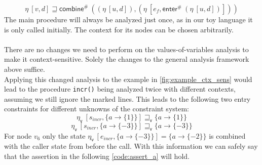     \[\eta\ [v, d] \sqsupseteq \textsf{combine}^{\#}\ ((\eta\ [u, d]), (\eta\ [e_f, \textsf{enter}^{\#}\ (\eta\ [u, d])])) \]
    The main procedure will always be analyzed just once, as in our toy language it is only called initially. The context for its nodes can be chosen arbitrarily.\\
    \\
    There are no changes we need to perform on the values-of-variables analysis to make it context-sensitive. Solely the changes to the general analysis framework above suffice.\\ Applying this changed analysis to the example in \autoref{fig:example_ctx_sens} would lead to the procedure \texttt{incr()} being analyzed twice with different contexts, assuming we still ignore the marked lines. This leads to the following two entry constraints for different unknowns of the constraint system:
    \[\eta_\textsf{v}\ [s_{incr}, \{a \rightarrow \{1\} \}] \sqsupseteq_\textsf{v} \{a \rightarrow \{1\} \} \]
    \[\eta_\textsf{v}\ [s_{incr}, \{a \rightarrow \{-3\} \}] \sqsupseteq_\textsf{v} \{a \rightarrow \{-3\} \} \]
    For node $v_6$ only the state $\eta_\textsf{v}\ [e_{incr}, \{a \rightarrow \{-3\} \}] = \{a \rightarrow \{-2\}\}$ is combined with the caller state from before the call. With this information we can safely say that the assertion in the following \autoref{code:assert_a} will hold.


